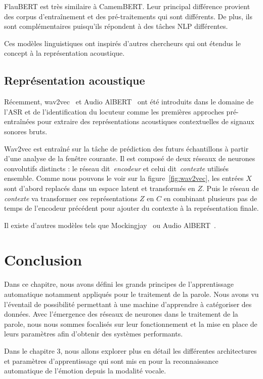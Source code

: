 FlauBERT est très similaire à CamemBERT. Leur principal différence provient des corpus d’entraînement et des pré-traitements qui sont différents. De plus, ils sont complémentaires puisqu'ils répondent à des tâches NLP différentes.

Ces modèles linguistiques ont inspirés d'autres chercheurs qui ont étendus le concept à la représentation acoustique.

\subsection{Représentation acoustique}
Récemment, wav2vec~\cite{Schneider2019} et Audio AlBERT~\cite{Chi2020} ont été introduits dans le domaine de l'ASR et de l'identification du locuteur comme les premières approches pré-entraînées pour extraire des représentations acoustiques contextuelles de signaux sonores bruts.



Wav2vec est entraîné sur la tâche de prédiction des futurs échantillons à partir d'une analyse de la fenêtre courante. Il est composé de deux réseaux de neurones convolutifs distincts : le réseau dit~\textit{encodeur} et celui dit~\textit{contexte} utilisés ensemble. Comme nous pouvons le voir sur la figure~\ref{fig:wav2vec}, les entrées $X$ sont d'abord replacés dans un espace latent et transformés en $Z$. Puis le réseau de \textit{contexte} va transformer ces représentations $Z$ en $C$ en combinant plusieurs pas de temps de l'encodeur précédent pour ajouter du contexte à la représentation finale.

Il existe d'autres modèles tels que Mockingjay~\cite{Liu2020} ou Audio AlBERT~\cite{Chi2020}.

\section{Conclusion}
Dans ce chapitre, nous avons défini les grands principes de l'apprentissage automatique notamment appliqués pour le traitement de la parole. Nous avons vu l'éventail de possibilité permettant à une machine d'apprendre à catégoriser des données. Avec l'émergence des réseaux de neurones dans le traitement de la parole, nous nous sommes focalisés sur leur fonctionnement et la mise en place de leurs paramètres afin d'obtenir des systèmes performants.

Dans le chapitre 3, nous allons explorer plus en détail les différentes architectures et paramètres d'apprentissage qui sont mis en pour la reconnaissance automatique de l'émotion depuis la modalité vocale.

